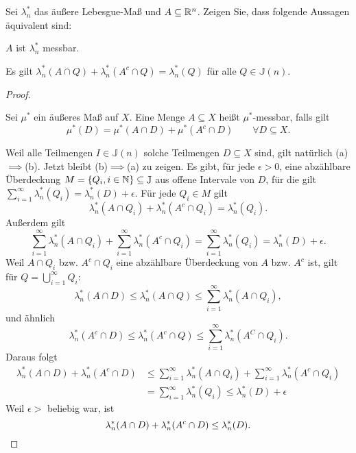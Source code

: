 \begin{Problem}
	Sei $\lambda^*_n$ das äußere Lebesgue-Maß und $A \subseteq \mathbb{R}^n$. Zeigen Sie, dass folgende Aussagen äquivalent sind:
	\begin{parts}
		\item $A$ ist $\lambda_n^*$ messbar.
		\item Es gilt $\lambda_n^*\left( A\cap Q \right) +\lambda_n^*\left( A^c\cap Q \right) =\lambda_n^*(Q)$ f\"{u}r alle $Q\in \mathbb{J}(n)$.
	\end{parts}
\end{Problem}
\begin{proof}\noindent 
	\begin{tcolorbox}
	\begin{Definition}
	Sei $\mu^*$ ein äußeres Maß auf $X$. Eine Menge $A\subseteq X$ heißt $\mu^*$-messbar, falls gilt
	\[
		\mu^*(D)=\mu^*(A\cap D)+\mu^*(A^c\cap D)\qquad \forall D\subseteq X
	.\] 
	\end{Definition}
\end{tcolorbox}
	Weil alle Teilmengen $I\in \mathbb{J}(n)$ solche Teilmengen $D\subseteq X$ sind, gilt natürlich (a)$\implies$(b). Jetzt bleibt (b)$\implies$(a) zu zeigen. Es gibt, f\"{u}r jede $\epsilon>0$, eine abzählbare Überdeckung $M=\left\{ Q_i, i\in \mathbb{N} \right\} \subseteq \mathbb{J}$ aus offene Intervale von $D$, f\"{u}r die gilt $\sum_{i=1}^{\infty} \lambda_n^*(Q_i)=\lambda_n^*(D)+\epsilon$. F\"{u}r jede $Q_i\in M$ gilt
	\[
		\lambda_n^*\left( A\cap Q_i \right) +\lambda_n^*\left( A^c\cap Q_i \right) =\lambda_n^*(Q_i)
	.\] 
	Außerdem gilt
	\[
	\sum_{i=1}^{\infty} \lambda_n^*\left( A\cap Q_i \right) +\sum_{i=1}^{\infty} \lambda_n^*\left( A^c\cap Q_i \right) =\sum_{i=1}^{\infty} \lambda_n^*(Q_i)=\lambda_n^*(D)+\epsilon
	.\] 
	Weil $A\cap Q_i$ bzw. $A^c\cap Q_i$ eine abzählbare Überdeckung von $A$ bzw. $A^c$ ist, gilt f\"{u}r $Q=\bigcup_{i=1}^\infty Q_i$:
	\[
	\lambda_n^*(A\cap D)\le \lambda_n^*(A \cap Q)\le \sum_{i=1}^{\infty} \lambda_n^*\left( A\cap Q_i \right) 
	,\]
	und ähnlich
	\[
	\lambda_n^*(A^c\cap D)\le \lambda_n^*(A^c\cap Q)\le \sum_{i=1}^{\infty} \lambda_n^*(A^C\cap Q_i)
	.\] 
	Daraus folgt
	\begin{align*}
		\lambda_n^*(A\cap D)+\lambda_n^*(A^c\cap D)&\le \sum_{i=1}^{\infty} \lambda_n^*(A\cap Q_i)+\sum_{i=1}^{\infty} \lambda_n^*(A^c\cap Q_i)\\
	&=\sum_{i=1}^{\infty} \lambda_n^*(Q_i)\le\lambda_n^*(D)+\epsilon
\end{align*}
Weil $\epsilon>$ beliebig war, ist
\[
	\lambda_n^*(A\cap D)+\lambda_n^*(A^c\cap D)\le \lambda_n^*(D)
.\qedhere\] 
\end{proof}

